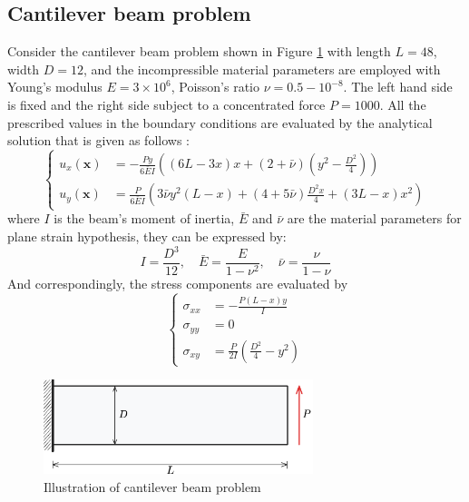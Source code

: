 \subsection{Cantilever beam problem}\label{sec:cantilever}
Consider the cantilever beam problem shown in Figure \ref{fg:cantilever_model} with length $L = 48$, width $D = 12$, and the incompressible material parameters are employed with Young's modulus $E = 3\times 10^6$, Poisson's ratio $\nu = 0.5-10^{-8}$. The left hand side is fixed and the right side subject to a concentrated force $P = 1000$. All the prescribed values in the boundary conditions are evaluated by the analytical solution that is given as follows \cite{timoshenko1969}:
\begin{equation}
\left\{
\begin{aligned}
u_x(\boldsymbol{x}) &= - \frac{Py}{6\bar{E}I} \left( (6L - 3x)x + (2 + \bar{\nu})(y^2 - \frac{D^2}{4}) \right) \\
u_y(\boldsymbol{x}) &= \frac{P}{6\bar{E}I} \left( 3 \bar{\nu} y^2(L-x) + (4+5\bar{\nu}) \frac{D^2x}{4} + (3L-x)x^2 \right)
\end{aligned}
\right.
\end{equation}
where $I$ is the beam's moment of inertia, $\bar{E}$ and $\bar{\nu}$ are the material parameters for plane strain hypothesis, they can be expressed by:
\begin{equation}
I = \frac{D^3}{12}, \quad \bar{E} = \frac{E}{1-\nu^2}, \quad \bar{\nu} = \frac{\nu}{1-\nu}
\end{equation}
And correspondingly, the stress components are evaluated by
\begin{equation}
\left\{
\begin{aligned}
\sigma_{xx} &= - \frac{P(L-x)y}{I} \\
\sigma_{yy} &= 0 \\
\sigma_{xy} &= \frac{P}{2I}(\frac{D^2}{4}-y^2)
\end{aligned}
\right.
\end{equation}

\begin{figure}[H]
\centering
\includegraphics[width=0.7\textwidth]{png/cantilever_model.png}
\caption{Illustration of cantilever beam problem}\label{fg:cantilever_model}
\end{figure}

